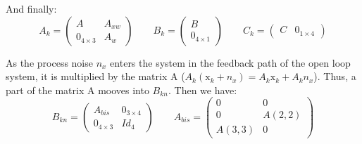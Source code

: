 And finally:
\begin{equation*}
  A_k = \begin{pmatrix}
   A & A_{xw}\\
   0_{4\times 3} & A_w
\end{pmatrix}
\qquad B_{k} = \begin{pmatrix}
	B\\
	0_{4\times 1}
\end{pmatrix}
\qquad C_{k} = \begin{pmatrix}
	C & 0_{1\times 4}
\end{pmatrix}
\end{equation*}

As the process noise $n_x$ enters the system in the feedback path of the open loop system, it is multiplied by the matrix A ($A_k (\text{x}_k+n_x) = A_k \text{x}_k + A_k n_x$). Thus, a part of the matrix A mooves into $B_{kn}$. Then we have:
\begin{equation*}
B_{kn} = \begin{pmatrix}
	A_{bis} & 0_{3\times 4} \\
	0_{4\times 3} & Id_4
\end{pmatrix}
\qquad A_{bis} = \begin{pmatrix}
	0 & 0 \\
	0 & A(2,2)\\
	A(3,3) & 0
	
\end{pmatrix}
\end{equation*}